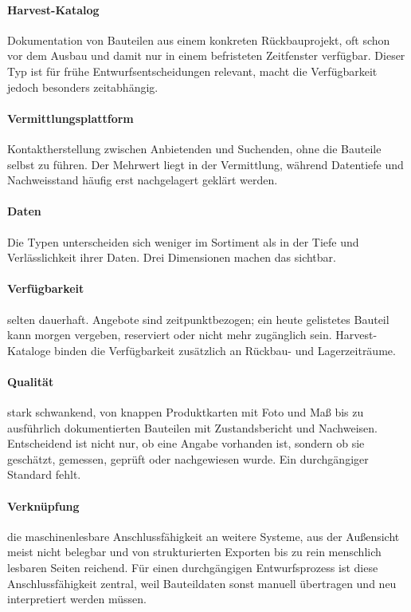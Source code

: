 \documentclass[type=zwischenbericht]{zukunftbau}
\begin{document}
\begin{SemioNest}
\begin{SemioNest}
\begin{SemioNest}
\paragraph{Harvest-Katalog}
Dokumentation von Bauteilen aus einem konkreten Rückbauprojekt, oft schon vor dem Ausbau und damit nur in einem befristeten Zeitfenster verfügbar. Dieser Typ ist für frühe Entwurfsentscheidungen relevant, macht die Verfügbarkeit jedoch besonders zeitabhängig.

\paragraph{Vermittlungsplattform}
Kontaktherstellung zwischen Anbietenden und Suchenden, ohne die Bauteile selbst zu führen. Der Mehrwert liegt in der Vermittlung, während Datentiefe und Nachweisstand häufig erst nachgelagert geklärt werden.
\end{SemioNest}

\paragraph{Daten}
Die Typen unterscheiden sich weniger im Sortiment als in der Tiefe und Verlässlichkeit ihrer Daten. Drei Dimensionen machen das sichtbar.

\begin{SemioNest}
\paragraph{Verfügbarkeit}
selten dauerhaft. Angebote sind zeitpunktbezogen; ein heute gelistetes Bauteil kann morgen vergeben, reserviert oder nicht mehr zugänglich sein. Harvest-Kataloge binden die Verfügbarkeit zusätzlich an Rückbau- und Lagerzeiträume.

\paragraph{Qualität}
stark schwankend, von knappen Produktkarten mit Foto und Maß bis zu ausführlich dokumentierten Bauteilen mit Zustandsbericht und Nachweisen. Entscheidend ist nicht nur, ob eine Angabe vorhanden ist, sondern ob sie geschätzt, gemessen, geprüft oder nachgewiesen wurde. Ein durchgängiger Standard fehlt.

\paragraph{Verknüpfung}
die maschinenlesbare Anschlussfähigkeit an weitere Systeme, aus der Außensicht meist nicht belegbar und von strukturierten Exporten bis zu rein menschlich lesbaren Seiten reichend. Für einen durchgängigen Entwurfsprozess ist diese Anschlussfähigkeit zentral, weil Bauteildaten sonst manuell übertragen und neu interpretiert werden müssen.
\end{SemioNest}
\end{SemioNest}


\end{SemioNest}
\end{document}
